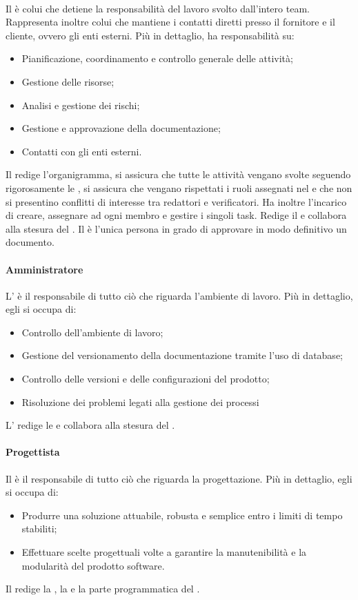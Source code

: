 \paragraph{\RdP}
Il \textsl{\RdP} è colui che detiene la responsabilità del 
lavoro svolto dall'intero team. Rappresenta inoltre colui che mantiene i 
contatti diretti presso il fornitore e il cliente, ovvero gli enti esterni. Più 
in dettaglio, ha responsabilità su:
\begin{itemize}
  \item Pianificazione, coordinamento e controllo generale delle attività;
  \item Gestione delle risorse;
  \item Analisi e gestione dei rischi;
  \item Gestione e approvazione della documentazione;
  \item Contatti con gli enti esterni.
\end{itemize}
Il \textsl{\RdP} redige l'organigramma, si assicura che 
tutte le attività vengano svolte seguendo rigorosamente le \textsl{\NdP}, si 
assicura che vengano rispettati i ruoli assegnati nel \textsl{\PdP} e che non si 
presentino conflitti di interesse tra redattori e verificatori. Ha inoltre 
l'incarico di creare, assegnare ad ogni membro e gestire i singoli task. Redige 
il \textsl{\PdP} e collabora alla stesura del \textsl{\PdQ}. Il \textsl{\RdP} è 
l'unica persona in grado di approvare in modo definitivo un documento.

\paragraph{Amministratore}
L'\textsl{\Amm} è il responsabile di tutto ciò che riguarda l'ambiente di 
lavoro. Più in dettaglio, egli si occupa di:
\begin{itemize}
  \item Controllo dell'ambiente di lavoro;
  \item Gestione del versionamento della documentazione tramite l'uso di 
  database;
  \item Controllo delle versioni e delle configurazioni del prodotto;
  \item Risoluzione dei problemi legati alla gestione dei processi
\end{itemize}
L'\textsl{\Amm} redige le \textsl{\NdP} e collabora alla stesura del 
\textsl{\PdP}.

\paragraph{Progettista}
Il \textsl{\Prog} è il responsabile di tutto ciò che riguarda la progettazione. 
Più in dettaglio, egli si occupa di:
\begin{itemize}
  \item Produrre una soluzione attuabile, robusta e semplice entro i limiti di 
  tempo stabiliti;
  \item Effettuare scelte progettuali volte a garantire la manutenibilità e la 
  modularità del prodotto software.
\end{itemize}
Il \textsl{\Prog} redige la \textsl{\ST}, la \textsl{\DDP} e la parte 
programmatica del \textsl{\PdQ}.

